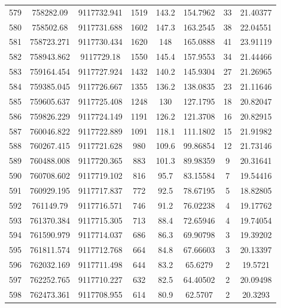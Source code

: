 \begin{longtable}{cccccccc}
579  & 758282.09       & 9117732.941      & 1519    & 143.2 & 154.7962 & 33 & 21.40377 \\
580  & 758502.68       & 9117731.688      & 1602    & 147.3 & 163.2545 & 38 & 22.04551 \\
581  & 758723.271      & 9117730.434      & 1620    & 148   & 165.0888 & 41 & 23.91119 \\
582  & 758943.862      & 9117729.18       & 1550    & 145.4 & 157.9553 & 34 & 21.44466 \\
583  & 759164.454      & 9117727.924      & 1432    & 140.2 & 145.9304 & 27 & 21.26965 \\
584  & 759385.045      & 9117726.667      & 1355    & 136.2 & 138.0835 & 23 & 21.11646 \\
585  & 759605.637      & 9117725.408      & 1248    & 130   & 127.1795 & 18 & 20.82047 \\
586  & 759826.229      & 9117724.149      & 1191    & 126.2 & 121.3708 & 16 & 20.82915 \\
587  & 760046.822      & 9117722.889      & 1091    & 118.1 & 111.1802 & 15 & 21.91982 \\
588  & 760267.415      & 9117721.628      & 980     & 109.6 & 99.86854 & 12 & 21.73146 \\
589  & 760488.008      & 9117720.365      & 883     & 101.3 & 89.98359 & 9  & 20.31641 \\
590  & 760708.602      & 9117719.102      & 816     & 95.7  & 83.15584 & 7  & 19.54416 \\
591  & 760929.195      & 9117717.837      & 772     & 92.5  & 78.67195 & 5  & 18.82805 \\
592  & 761149.79       & 9117716.571      & 746     & 91.2  & 76.02238 & 4  & 19.17762 \\
593  & 761370.384      & 9117715.305      & 713     & 88.4  & 72.65946 & 4  & 19.74054 \\
594  & 761590.979      & 9117714.037      & 686     & 86.3  & 69.90798 & 3  & 19.39202 \\
595  & 761811.574      & 9117712.768      & 664     & 84.8  & 67.66603 & 3  & 20.13397 \\
596  & 762032.169      & 9117711.498      & 644     & 83.2  & 65.6279  & 2  & 19.5721  \\
597  & 762252.765      & 9117710.227      & 632     & 82.5  & 64.40502 & 2  & 20.09498 \\
598  & 762473.361      & 9117708.955      & 614     & 80.9  & 62.5707  & 2  & 20.3293  \\

\end{longtable}
